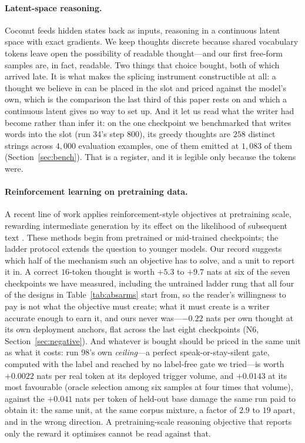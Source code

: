\documentclass{article} %
\begin{document}
\paragraph{Latent-space reasoning.} Coconut \citep{hao2024coconut} feeds hidden states back as inputs, reasoning in a continuous latent space with exact gradients. We keep thoughts discrete because shared vocabulary tokens leave open the possibility of readable thought---and our first free-form samples are, in fact, readable. Two things that choice bought, both of which arrived late. It is what makes the splicing instrument constructible at all: a thought we believe in can be placed in the slot and priced against the model's own, which is the comparison the last third of this paper rests on and which a continuous latent gives no way to set up. And it let us read what the writer had become rather than infer it: on the one checkpoint we benchmarked that writes words into the slot (run 34's step $800$), its greedy thoughts are $258$ distinct strings across $4{,}000$ evaluation examples, one of them emitted at $1{,}083$ of them (Section~\ref{sec:bench}). That is a register, and it is legible only because the tokens were.

\paragraph{Reinforcement learning on pretraining data.} A recent line of work applies reinforcement-style objectives at pretraining scale, rewarding intermediate generation by its effect on the likelihood of subsequent text \citep{nvidia2025rlp}. These methods begin from pretrained or mid-trained checkpoints; the ladder protocol extends the question to younger models. Our record suggests which half of the mechanism such an objective has to solve, and a unit to report it in. A correct $16$-token thought is worth $+5.3$ to $+9.7$ nats at six of the seven checkpoints we have measured, including the untrained ladder rung that all four of the designs in Table~\ref{tab:absarms} start from, so the reader's willingness to pay is not what the objective must create; what it must create is a writer accurate enough to earn it, and ours never was---$-0.22$ nats per own thought at its own deployment anchors, flat across the last eight checkpoints (N6, Section~\ref{sec:negative}). And whatever is bought should be priced in the same unit as what it costs: run 98's own \emph{ceiling}---a perfect speak-or-stay-silent gate, computed with the label and reached by no label-free gate we tried---is worth $+0.0022$ nats per real token at its deployed trigger volume, and $+0.0143$ at its most favourable (oracle selection among six samples at four times that volume), against the $+0.041$ nats per token of held-out base damage the same run paid to obtain it: the same unit, at the same corpus mixture, a factor of $2.9$ to $19$ apart, and in the wrong direction. A pretraining-scale reasoning objective that reports only the reward it optimises cannot be read against that.
\end{document}
